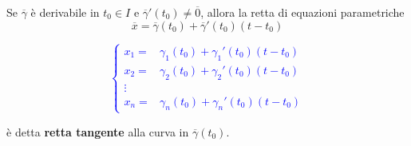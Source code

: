 \begin{definition}
		Se $\overline{\gamma}$ è derivabile in $t_0 \in I$ e $\overline{\gamma}' (t_0)\neq \overline{0}$, allora la retta di equazioni parametriche
	\begin{equation*}
		\overline{x}=\overline{\gamma}(t_0)+\overline{\gamma}'(t_0)(t-t_0)
	\end{equation*}
	
	\textcolor{blue}{
		\begin{equation*}
			\begin{cases}
				x_1=&\gamma_1(t_0)+\gamma_1'(t_0)(t-t_0)\\
				x_2=&\gamma_2(t_0)+\gamma_2'(t_0)(t-t_0)\\
				\vdots\\
				x_n=&\gamma_n(t_0)+\gamma_n'(t_0)(t-t_0)
			\end{cases}
		\end{equation*}
	}
	
	è detta \textbf{retta tangente} alla curva in $\overline{\gamma}(t_0)$.
\end{definition}


